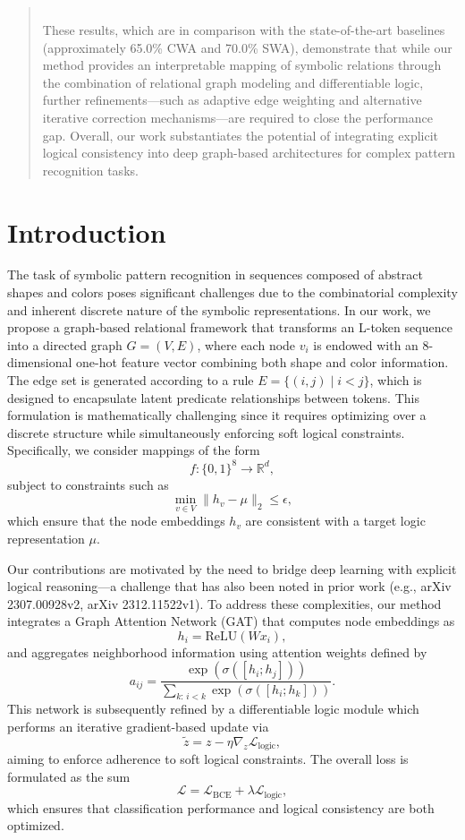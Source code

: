 \documentclass{article}
\begin{document}
\begin{abstract}
\begin{tabular}{lccc}
\hline
\end{tabular}\newline
These results, which are in comparison with the state-of-the-art baselines (approximately 65.0\% CWA and 70.0\% SWA), demonstrate that while our method provides an interpretable mapping of symbolic relations through the combination of relational graph modeling and differentiable logic, further refinements—such as adaptive edge weighting and alternative iterative correction mechanisms—are required to close the performance gap. Overall, our work substantiates the potential of integrating explicit logical consistency into deep graph-based architectures for complex pattern recognition tasks.
\end{abstract}

\section{Introduction}
The task of symbolic pattern recognition in sequences composed of abstract shapes and colors poses significant challenges due to the combinatorial complexity and inherent discrete nature of the symbolic representations. In our work, we propose a graph‐based relational framework that transforms an L-token sequence into a directed graph \( G = (V, E) \), where each node \( v_i \) is endowed with an 8-dimensional one-hot feature vector combining both shape and color information. The edge set is generated according to a rule \( E = \{(i,j) \mid i < j\} \), which is designed to encapsulate latent predicate relationships between tokens. This formulation is mathematically challenging since it requires optimizing over a discrete structure while simultaneously enforcing soft logical constraints. Specifically, we consider mappings of the form 
\[
f: \{0,1\}^8 \rightarrow \mathbb{R}^d,
\]
subject to constraints such as 
\[
\min_{v \in V} \| h_v - \mu \|_2 \leq \epsilon,
\]
which ensure that the node embeddings \( h_v \) are consistent with a target logic representation \( \mu \). 

Our contributions are motivated by the need to bridge deep learning with explicit logical reasoning—a challenge that has also been noted in prior work (e.g., arXiv 2307.00928v2, arXiv 2312.11522v1). To address these complexities, our method integrates a Graph Attention Network (GAT) that computes node embeddings as 
\[
h_i = \text{ReLU}(W x_i),
\]
and aggregates neighborhood information using attention weights defined by 
\[
a_{ij} = \frac{\exp\left( \sigma\left( [h_i; h_j] \right) \right)}{\sum_{k:\, i<k} \exp\left( \sigma\left( [h_i; h_k] \right) \right)}.
\]
This network is subsequently refined by a differentiable logic module which performs an iterative gradient-based update via 
\[
\tilde{z} = z - \eta \nabla_z \mathcal{L}_{\text{logic}},
\]
aiming to enforce adherence to soft logical constraints. The overall loss is formulated as the sum 
\[
\mathcal{L} = \mathcal{L}_{\text{BCE}} + \lambda \mathcal{L}_{\text{logic}},
\]
which ensures that classification performance and logical consistency are both optimized.
\end{document}
